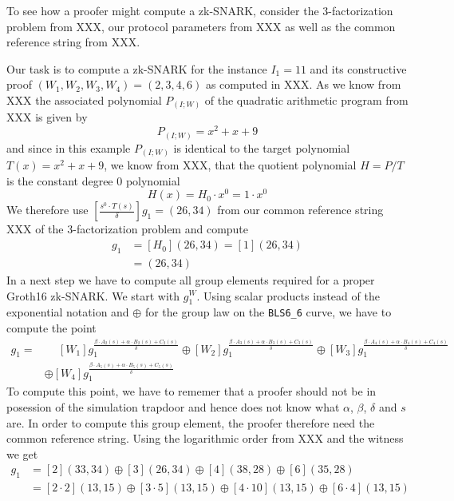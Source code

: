\begin{example} To see how a proofer might compute 
a zk-SNARK, consider the $3$-factorization problem from XXX, our protocol parameters from XXX as well as the common reference string from XXX.

Our task is to compute a zk-SNARK for the instance $I_1=11$ and its constructive proof $(W_1,W_2,W_3,W_4)=(2,3,4,6)$ as computed in XXX. As we know from XXX the associated polynomial $P_{(I;W)}$ of the quadratic arithmetic program from XXX is given by
$$
P_{(I;W)} = x^2 + x + 9
$$ 
and since in this example $P_{(I;W)}$ is identical to the target polynomial $T(x)=x^2+x + 9$, we know from XXX, that the quotient polynomial $H=P/T$ is the constant degree $0$ polynomial
$$
H(x)= H_0 \cdot x^0 = 1 \cdot x^0
$$
We therefore use $[\frac{s^0\cdot T(s)}{\delta}]g_1=(26,34)$ from our common reference string XXX of the $3$-factorization problem and compute 
\begin{align*}
[\frac{H(s)\cdot T(s)}{\delta}]g_1 &= [H_0](26,34)=[1](26,34)\\
                                   &= (26,34)
\end{align*}
In a next step we have to compute all group elements required for a proper Groth16 zk-SNARK. We start with $g_1^W$. Using scalar products instead of the exponential notation and $\oplus$ for the group law on the \texttt{BLS6\_6} curve, we have to compute the point
\begin{align*}
[W]g_1 = & \phantom{\oplus} [W_1] g_1^{\frac{\beta\cdot A_{2}(s)+\alpha\cdot B_{2}(s)+C_{2}(s)}{\delta}}
        \oplus [W_2] g_1^{\frac{\beta\cdot A_{3}(s)+\alpha\cdot B_{3}(s)+C_{3}(s)}{\delta}}        
         \oplus [W_3] g_1^{\frac{\beta\cdot A_{4}(s)+\alpha\cdot B_{4}(s)+C_{4}(s)}{\delta}}\\        
         &\oplus [W_4] g_1^{\frac{\beta\cdot A_{5}(s)+\alpha\cdot B_{5}(s)+C_{5}(s)}{\delta}}
\end{align*}
To compute this point, we have to rememer that a proofer should not be in posession of the simulation trapdoor and hence does not know what $\alpha$, $\beta$, $\delta$ and $s$ are. In order to compute this group element, the proofer therefore need the common reference string. Using the logarithmic order from XXX and the witness we get
\begin{align*}
[W]g_1 & = [2](33,34)\oplus [3](26,34)\oplus [4](38,28)\oplus [6](35,28) \\
      & = [2\cdot 2](13,15)\oplus [3\cdot 5](13,15)\oplus [4\cdot 10](13,15)\oplus [6\cdot 4](13,15) \\        

\end{align*}
\end{example}
